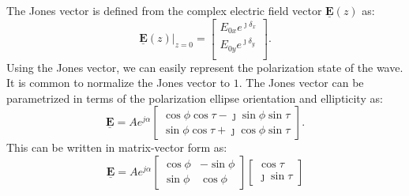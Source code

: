 \documentclass[11pt]{article}
\begin{document}
The Jones vector is defined from the complex electric field vector $\mathbf{\underline{E}}\left(z\right)$ as:
\begin{equation}
	\mathbf{\underline{E}}\left(z\right)\bigr|_{z=0} = 
	 \begin{bmatrix}
		E_{0x} e^{\jmath\delta_{x}} \\
		E_{0y} e^{\jmath\delta_{y}} \\
	\end{bmatrix}.
\end{equation}
Using the Jones vector, we can easily represent the polarization state of the wave. It is common to normalize the Jones vector to $1$.
The Jones vector can be parametrized in terms of the polarization ellipse orientation and ellipticity as:
\begin{equation}
	\mathbf{\underline{E}} = A e^{j\alpha}
	\begin{bmatrix}
		\cos\phi\cos\tau - \jmath \sin\phi\sin\tau \\
		\sin\phi\cos\tau + \jmath \cos\phi\sin\tau
	\end{bmatrix}.
\end{equation}
This can be written in matrix-vector form as:
\begin{equation}
	\mathbf{\underline{E}} = A e^{j\alpha}
	\begin{bmatrix}
		\cos\phi &	-\sin\phi \\
		\sin\phi &	\cos\phi
	\end{bmatrix}
	\begin{bmatrix}
		\cos\tau\\
		\jmath\sin\tau
	\end{bmatrix}
\end{equation}
\end{document}
